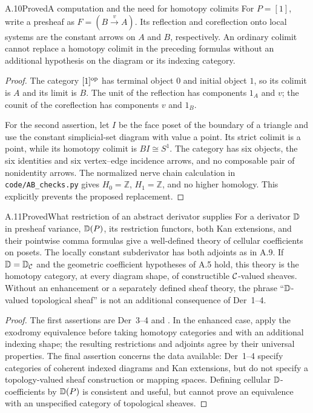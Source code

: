 \begin{statement}{A.10}{Proved}{A computation and the need for homotopy colimits}
For $P=[1]$, write a presheaf as $F=(B\xrightarrow{v}A)$. Its reflection
and coreflection onto local systems are the constant arrows on $A$ and
$B$, respectively. An ordinary colimit cannot replace a homotopy colimit
in the preceding formulas without an additional hypothesis on the diagram
or its indexing category.
\end{statement}
\begin{proof}
The category $[1]^{\mathrm{op}}$ has terminal object $0$ and initial object $1$,
so its colimit is $A$ and its limit is $B$. The unit of the reflection
has components $1_A$ and $v$; the counit of the coreflection has components
$v$ and $1_B$.

For the second assertion, let $I$ be the face poset of the boundary of
a triangle and use the constant simplicial-set diagram with value a
point. Its strict colimit is a point, while its homotopy colimit is
$BI\cong S^1$. The category has six objects, the six identities and six
vertex--edge incidence arrows, and no composable pair of nonidentity
arrows. The normalized nerve chain calculation in
\texttt{code/AB\_checks.py} gives $H_0=\mathbb Z$, $H_1=\mathbb Z$,
and no higher homology. This explicitly prevents the proposed replacement.
\end{proof}

\begin{statement}{A.11}{Proved}{What restriction of an abstract derivator supplies}
For a derivator $\mathbb D$ in presheaf variance, $\mathbb D(P)$, its restriction
functors, both Kan extensions, and their pointwise comma formulas give
a well-defined theory of cellular coefficients on posets. The locally
constant subderivator has both adjoints as in A.9. If
$\mathbb D=\mathbb D_{\mathcal C}$ and the geometric coefficient hypotheses of A.5 hold,
this theory is the homotopy category, at every diagram shape, of
constructible $\mathcal C$-valued sheaves. Without an enhancement or a separately
defined sheaf theory, the phrase ``$\mathbb D$-valued topological sheaf'' is not
an additional consequence of Der~1--4.
\end{statement}
\begin{proof}
The first assertions are Der~3--4 and
\citet[Theorem 3.13]{Cisinski2009}. In the enhanced case, apply the
exodromy equivalence before taking homotopy categories and with an
additional indexing shape; the resulting restrictions and adjoints agree
by their universal properties. The final assertion concerns the data
available: Der~1--4 specify categories of coherent indexed diagrams and
Kan extensions, but do not specify a topology-valued sheaf construction
or mapping spaces. Defining cellular $\mathbb D$-coefficients by $\mathbb D(P)$ is
consistent and useful, but cannot prove an equivalence with an unspecified
category of topological sheaves.
\end{proof}

